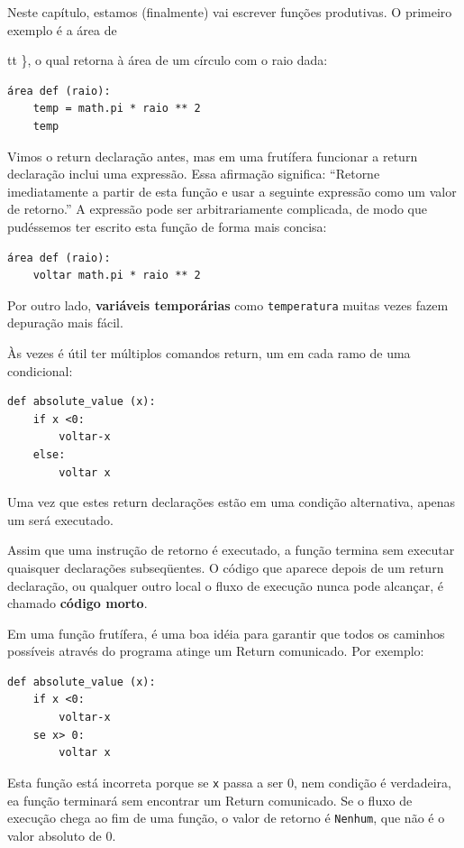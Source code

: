 \documentclass[10pt]{book}
\begin{document}
\begin{exercise}
{{Neste capítulo, estamos (finalmente) vai escrever funções produtivas.
O primeiro exemplo é a área de {tt \}, o qual retorna à área de um círculo
com o raio dada:

\begin{verbatim}
área def (raio):
    temp = math.pi * raio ** 2
    temp
\end{verbatim}
%
Vimos o {return \tt} declaração antes, mas em uma frutífera
funcionar a {return \tt} declaração inclui
uma expressão. Essa afirmação significa: ``Retorne imediatamente a partir de
esta função e usar a seguinte expressão como um valor de retorno.''
A expressão pode ser arbitrariamente complicada, de modo que pudéssemos
ter escrito esta função de forma mais concisa:

\begin{verbatim}
área def (raio):
    voltar math.pi * raio ** 2
\end{verbatim}
%
Por outro lado, {\bf variáveis ​​temporárias} como {\tt temperatura} muitas vezes fazem
depuração mais fácil.

Às vezes é útil ter múltiplos comandos return, um em cada
ramo de uma condicional:

\begin{verbatim}
def absolute_value (x):
    if x <0:
        voltar-x
    else:
        voltar x
\end{verbatim}
%
Uma vez que estes {return \tt} declarações estão em uma condição alternativa,
apenas um será executado.

Assim que uma instrução de retorno é executado, a função
termina sem executar quaisquer declarações subseqüentes.
O código que aparece depois de um {return \tt} declaração, ou qualquer outro local
o fluxo de execução nunca pode alcançar, é chamado {\bf código morto}.

Em uma função frutífera, é uma boa idéia para garantir
que todos os caminhos possíveis através do programa atinge um
{Return \tt} comunicado. Por exemplo:

\begin{verbatim}
def absolute_value (x):
    if x <0:
        voltar-x
    se x> 0:
        voltar x
\end{verbatim}
%
Esta função está incorreta porque se {\tt x} passa a ser 0,
nem condição é verdadeira, ea função terminará sem encontrar um
{Return \tt} comunicado. Se o fluxo de execução chega ao fim
de uma função, o valor de retorno é {\tt Nenhum}, que não é
o valor absoluto de 0.

}}}
\end{exercise}
\end{document}
